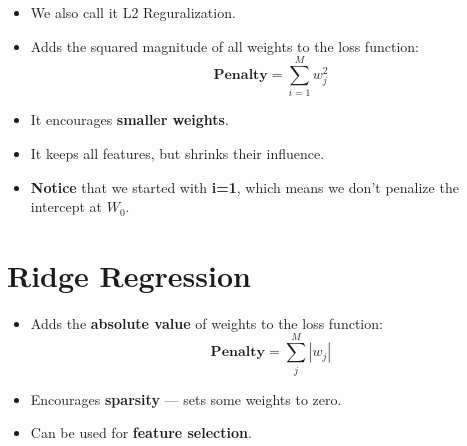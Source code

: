 \documentclass[20pt]{article}
\begin{document}
\begin{itemize}
    \item We also call it L2 Reguralization.

    \item Adds the squared magnitude of all weights to the loss function:
    \begin{equation}
        \mathbf{Penalty} = \sum_{i=1}^{M} w_j^2
    \end{equation}

    \item It encourages \textbf{smaller weights}.

    \item It keeps all features, but shrinks their influence.
    \item \textbf{Notice} that we started with \textbf{i=1}, which means we don't penalize the intercept at $W_0$.
\end{itemize}

\section{Ridge Regression}

\begin{itemize}
    \item Adds the \textbf{absolute value} of weights to the loss function:
    \begin{equation}
        \mathbf{Penalty} = \sum_{j}^{M} \left| w_j \right|
    \end{equation}

    \item Encourages \textbf{sparsity} — sets some weights to zero.

    \item Can be used for \textbf{feature selection}.

\end{itemize}
\end{document}
